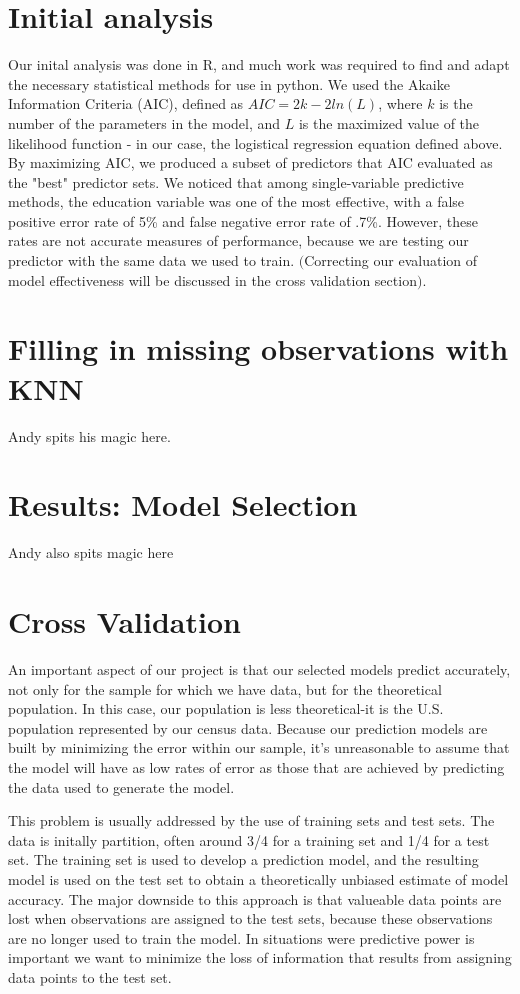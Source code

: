 \documentclass[11pt]{article}
\begin{document}
\section{Initial analysis}
Our inital analysis was done in R, and much work was required to find and adapt the necessary statistical methods for use in python. 
We used the Akaike Information Criteria (AIC), defined as $AIC = 2k - 2ln(L)$, where $k$ is the number of the parameters in the model, and $L$ is the maximized value of the likelihood function - in our case, the logistical regression equation defined above. By maximizing AIC, we produced a subset of predictors that AIC evaluated as the "best" predictor sets. We noticed that among single-variable predictive methods, the education variable was one of the most effective, with a false positive error rate of 5\% and false negative error rate of .7\%. However, these rates are not accurate measures of performance, because we are testing our predictor with the same data we used to train. $($Correcting our evaluation of model effectiveness will be discussed in the cross validation section$)$.

\section{Filling in missing observations with KNN}
Andy spits his magic here. 

\section{ Results: Model Selection}
Andy also spits magic here
\section{Cross Validation}
An important aspect of our project is that our selected models predict accurately, not only for the sample for which we have data, but for the theoretical population. In this case, our population is less theoretical-it is the U.S. population represented by our census data. Because our prediction models are built by minimizing the error within our sample, it's unreasonable to assume that the model will have as low rates of error as those that are achieved by predicting the data used to generate the model.


This problem is usually addressed by the use of training sets and test sets. The data is initally partition, often around 3/4 for a training set and 1/4 for a test set. The training set is used to develop a prediction model, and the resulting model is used on the test set to obtain a theoretically unbiased estimate of model accuracy. The major downside to this approach is that valueable data points are lost when observations are assigned to the test sets, because these observations are no longer used to train the model. In situations were predictive power is important we want to minimize the loss of information that results from assigning data points to the test set. 
\end{document}
